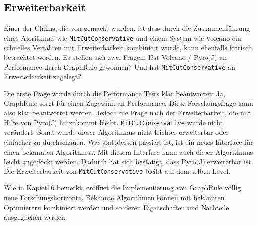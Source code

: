 \subsection{Erweiterbarkeit}

Einer der Claims, die von \cite{} gemacht wurden, ist dass durch die Zusammenführung eines Alorithmus wie \texttt{MitCutConservative} und einem System wie Volcano ein schnelles Verfahren mit Erweiterbarkeit kombiniert wurde, kann ebenfalls kritisch betrachtet werden. Es stellen sich zwei Fragen: Hat Volcano / Pyro(J) an Performance durch GraphRule gewonnen? Und hat \texttt{MitCutConservative} an Erweiterbarkeit zugelegt?

Die erste Frage wurde durch die Performance Tests klar beantwortet: Ja, GraphRule sorgt für einen Zugewinn an Performance. Diese Forschungsfrage kann also klar beantwortet werden. Jedoch die Frage nach der Erweiterbarkeit, die mit Hilfe von Pyro(J) hinzukommt bleibt. \texttt{MitCutConservative} wurde nicht verändert. Somit wurde dieser Algorithmus nicht leichter erweiterbar oder einfacher zu durchschauen. Was stattdessen passiert ist, ist ein neues Interface für einen bekannten Algorithmus. Mit diesem Interface kann auch dieser Algorithmus leicht angedockt werden. Dadurch hat sich bestätigt, dass Pyro(J) erweiterbar ist. Die Erweiterbarkeit von \texttt{MitCutConservative} bleibt auf dem selben Level.

Wie in Kapietl 6 bemerkt, eröffnet die Implementierung von GraphRule völlig neue Forschungshorizonte. Bekannte Algorithmen können mit bekannten Optimierern kombiniert werden und so deren Eigenschaften und Nachteile ausgeglichen werden.



